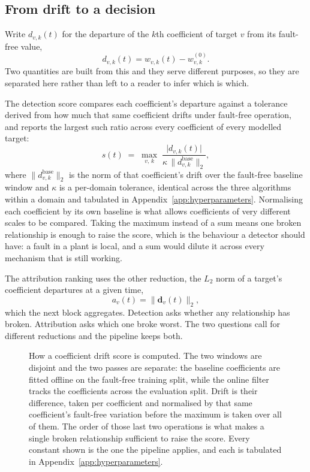 \subsection{From drift to a decision}

Write $d_{v,k}(t)$ for the departure of the $k$th coefficient of target $v$ from its fault-free value,
\[
  d_{v,k}(t) = w_{v,k}(t) - w_{v,k}^{(0)} .
\]
Two quantities are built from this and they serve different purposes, so they are separated here rather than left to a reader to infer which is which.

The detection score compares each coefficient's departure against a tolerance derived from how much that same coefficient drifts under fault-free operation, and reports the largest such ratio across every coefficient of every modelled target:
\[
  s(t) \;=\; \max_{v,\,k}\;
  \frac{\bigl| d_{v,k}(t) \bigr|}
       {\kappa \, \bigl\lVert d^{\text{base}}_{v,k} \bigr\rVert_2},
\]
where $\lVert d^{\text{base}}_{v,k} \rVert_2$ is the norm of that coefficient's drift over the fault-free baseline window and $\kappa$ is a per-domain tolerance, identical across the three algorithms within a domain and tabulated in Appendix~\ref{app:hyperparameters}. Normalising each coefficient by its own baseline is what allows coefficients of very different scales to be compared. Taking the maximum instead of a sum means one broken relationship is enough to raise the score, which is the behaviour a detector should have: a fault in a plant is local, and a sum would dilute it across every mechanism that is still working.

The attribution ranking uses the other reduction, the $L_2$ norm of a target's coefficient departures at a given time,
\[
  a_v(t) = \big\lVert \mathbf{d}_{v}(t) \big\rVert_2 ,
\]
which the next block aggregates. Detection asks whether any relationship has broken. Attribution asks which one broke worst. The two questions call for different reductions and the pipeline keeps both.

\begin{figure}[htbp]
  \centering
  \resizebox{0.82\textwidth}{!}{}
  \caption[How a coefficient drift score is computed]{How a coefficient drift score is computed. The two windows are disjoint and the two passes are separate: the baseline coefficients are fitted offline on the fault-free training split, while the online filter tracks the coefficients across the evaluation split. Drift is their difference, taken per coefficient and normalised by that same coefficient's fault-free variation before the maximum is taken over all of them. The order of those last two operations is what makes a single broken relationship sufficient to raise the score. Every constant shown is the one the pipeline applies, and each is tabulated in Appendix~\ref{app:hyperparameters}.}
  \label{fig:drift-pipeline}
\end{figure}

